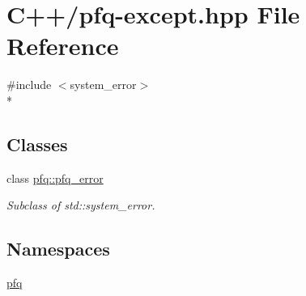 \hypertarget{pfq-except_8hpp}{\section{C++/pfq-\/except.hpp File Reference}
\label{pfq-except_8hpp}
}
{\ttfamily \#include $<$system\+\_\+error$>$}\\*
\subsection*{Classes}
\begin{DoxyCompactItemize}
\item 
class \hyperlink{classpfq_1_1pfq__error}{pfq\+::pfq\+\_\+error}
\begin{DoxyCompactList}\small\item\em Subclass of std\+::system\+\_\+error. \end{DoxyCompactList}\end{DoxyCompactItemize}
\subsection*{Namespaces}
\begin{DoxyCompactItemize}
\item 
 \hyperlink{namespacepfq}{pfq}
\end{DoxyCompactItemize}
